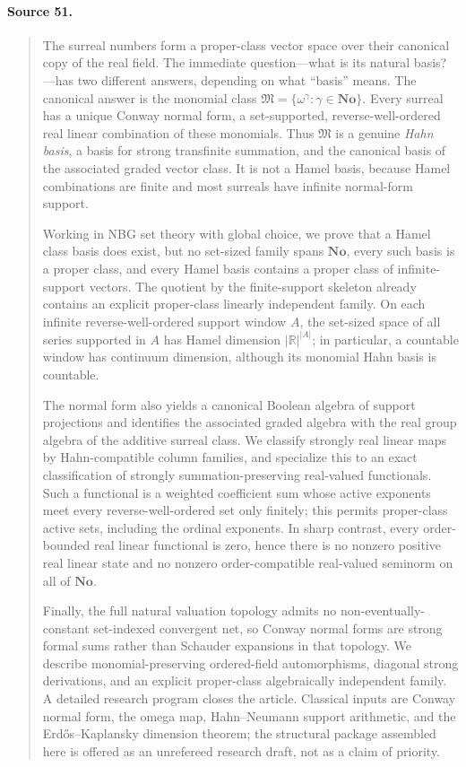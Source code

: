 \documentclass[11pt,letterpaper]{article}
\numberwithin{equation}{section}
\theoremstyle{definition}
\theoremstyle{remark}
\newcommand{\No}{\mathbf{No}}
\newcommand{\R}{\mathbb{R}}
\newcommand{\M}{\mathfrak{M}}
\begin{document}
\paragraph{Source 51.}
\begin{quote}\small

The surreal numbers form a proper-class vector space over their canonical
copy of the real field.  The immediate question---what is its natural
basis?---has two different answers, depending on what ``basis'' means.
The canonical answer is the monomial class
\(
  \M=\{\omega^\gamma:\gamma\in\No\}.
\)
Every surreal has a unique Conway normal form, a set-supported,
reverse-well-ordered real linear combination of these monomials.  Thus
\(\M\) is a genuine \emph{Hahn basis}, a basis for strong transfinite
summation, and the canonical basis of the associated graded vector class.
It is not a Hamel basis, because Hamel combinations are finite and most
surreals have infinite normal-form support.

Working in NBG set theory with global choice, we prove that a Hamel class
basis does exist, but no set-sized family spans \(\No\), every such basis is
a proper class, and every Hamel basis contains a proper class of
infinite-support vectors.  The quotient by the finite-support skeleton
already contains an explicit proper-class linearly independent family.
On each infinite reverse-well-ordered support window \(A\), the set-sized
space of all series supported in \(A\) has Hamel dimension
\(\lvert\R\rvert^{\lvert A\rvert}\); in particular, a countable window has
continuum dimension, although its monomial Hahn basis is countable.

The normal form also yields a canonical Boolean algebra of support
projections and identifies the associated graded algebra with the real
group algebra of the additive surreal class.  We classify strongly real
linear maps by Hahn-compatible column families, and specialize this to an
exact classification of strongly summation-preserving real-valued
functionals.  Such a functional is a weighted coefficient sum whose active
exponents meet every reverse-well-ordered set only finitely; this permits
proper-class active sets, including the ordinal exponents.  In sharp
contrast, every order-bounded real linear functional is zero, hence there
is no nonzero positive real linear state and no nonzero order-compatible
real-valued seminorm on all of \(\No\).

Finally, the full natural valuation topology admits no non-eventually-
constant set-indexed convergent net, so Conway normal forms are strong
formal sums rather than Schauder expansions in that topology.  We describe
monomial-preserving ordered-field automorphisms, diagonal strong
derivations, and an explicit proper-class algebraically independent family.
A detailed research program closes the article.  Classical inputs are
Conway normal form, the omega map, Hahn--Neumann support arithmetic, and the
Erd\H{o}s--Kaplansky dimension theorem; the structural package assembled here
is offered as an unrefereed research draft, not as a claim of priority.
\end{quote}
\end{document}
